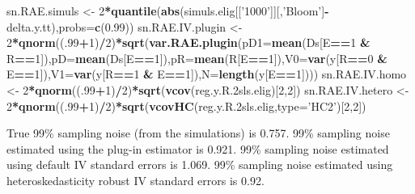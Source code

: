 \documentclass[]{book}
\newenvironment{Shaded}{\begin{snugshade}}{\end{snugshade}}
\newcommand{\DataTypeTok}[1]{\textcolor[rgb]{0.13,0.29,0.53}{#1}}
\newcommand{\DecValTok}[1]{\textcolor[rgb]{0.00,0.00,0.81}{#1}}
\newcommand{\FloatTok}[1]{\textcolor[rgb]{0.00,0.00,0.81}{#1}}
\newcommand{\KeywordTok}[1]{\textcolor[rgb]{0.13,0.29,0.53}{\textbf{#1}}}
\newcommand{\NormalTok}[1]{#1}
\newcommand{\OperatorTok}[1]{\textcolor[rgb]{0.81,0.36,0.00}{\textbf{#1}}}
\newcommand{\StringTok}[1]{\textcolor[rgb]{0.31,0.60,0.02}{#1}}
\theoremstyle{definition}
\theoremstyle{definition}
\theoremstyle{definition}
\theoremstyle{remark}
\begin{document}
\begin{Shaded}
\begin{Highlighting}[]
\NormalTok{sn.RAE.simuls <-}\StringTok{ }\DecValTok{2}\OperatorTok{*}\KeywordTok{quantile}\NormalTok{(}\KeywordTok{abs}\NormalTok{(simuls.elig[[}\StringTok{'1000'}\NormalTok{]][,}\StringTok{'Bloom'}\NormalTok{]}\OperatorTok{-}\NormalTok{delta.y.tt),}\DataTypeTok{probs=}\KeywordTok{c}\NormalTok{(}\FloatTok{0.99}\NormalTok{))}
\NormalTok{sn.RAE.IV.plugin <-}\StringTok{ }\DecValTok{2}\OperatorTok{*}\KeywordTok{qnorm}\NormalTok{((.}\DecValTok{99}\OperatorTok{+}\DecValTok{1}\NormalTok{)}\OperatorTok{/}\DecValTok{2}\NormalTok{)}\OperatorTok{*}\KeywordTok{sqrt}\NormalTok{(}\KeywordTok{var.RAE.plugin}\NormalTok{(}\DataTypeTok{pD1=}\KeywordTok{mean}\NormalTok{(Ds[E}\OperatorTok{==}\DecValTok{1} \OperatorTok{&}\StringTok{ }\NormalTok{R}\OperatorTok{==}\DecValTok{1}\NormalTok{]),}\DataTypeTok{pD=}\KeywordTok{mean}\NormalTok{(Ds[E}\OperatorTok{==}\DecValTok{1}\NormalTok{]),}\DataTypeTok{pR=}\KeywordTok{mean}\NormalTok{(R[E}\OperatorTok{==}\DecValTok{1}\NormalTok{]),}\DataTypeTok{V0=}\KeywordTok{var}\NormalTok{(y[R}\OperatorTok{==}\DecValTok{0} \OperatorTok{&}\StringTok{ }\NormalTok{E}\OperatorTok{==}\DecValTok{1}\NormalTok{]),}\DataTypeTok{V1=}\KeywordTok{var}\NormalTok{(y[R}\OperatorTok{==}\DecValTok{1} \OperatorTok{&}\StringTok{ }\NormalTok{E}\OperatorTok{==}\DecValTok{1}\NormalTok{]),}\DataTypeTok{N=}\KeywordTok{length}\NormalTok{(y[E}\OperatorTok{==}\DecValTok{1}\NormalTok{])))}
\NormalTok{sn.RAE.IV.homo <-}\StringTok{ }\DecValTok{2}\OperatorTok{*}\KeywordTok{qnorm}\NormalTok{((.}\DecValTok{99}\OperatorTok{+}\DecValTok{1}\NormalTok{)}\OperatorTok{/}\DecValTok{2}\NormalTok{)}\OperatorTok{*}\KeywordTok{sqrt}\NormalTok{(}\KeywordTok{vcov}\NormalTok{(reg.y.R}\FloatTok{.2}\NormalTok{sls.elig)[}\DecValTok{2}\NormalTok{,}\DecValTok{2}\NormalTok{])}
\NormalTok{sn.RAE.IV.hetero <-}\StringTok{ }\DecValTok{2}\OperatorTok{*}\KeywordTok{qnorm}\NormalTok{((.}\DecValTok{99}\OperatorTok{+}\DecValTok{1}\NormalTok{)}\OperatorTok{/}\DecValTok{2}\NormalTok{)}\OperatorTok{*}\KeywordTok{sqrt}\NormalTok{(}\KeywordTok{vcovHC}\NormalTok{(reg.y.R}\FloatTok{.2}\NormalTok{sls.elig,}\DataTypeTok{type=}\StringTok{'HC2'}\NormalTok{)[}\DecValTok{2}\NormalTok{,}\DecValTok{2}\NormalTok{])}
\end{Highlighting}
\end{Shaded}

True 99\% sampling noise (from the simulations) is 0.757.
99\% sampling noise estimated using the plug-in estimator is 0.921.
99\% sampling noise estimated using default IV standard errors is 1.069.
99\% sampling noise estimated using heteroskedasticity robust IV standard errors is 0.92.
\end{document}
